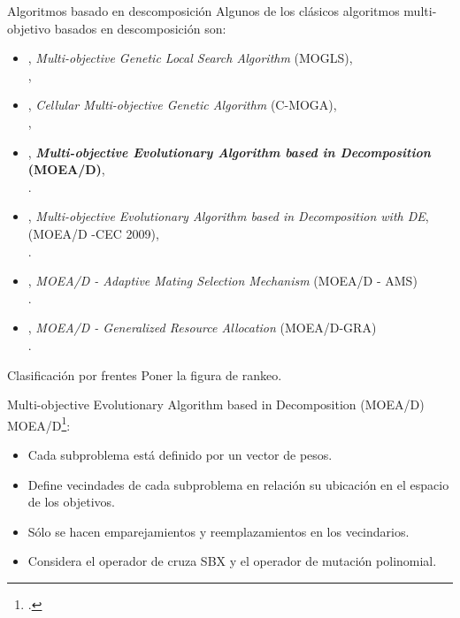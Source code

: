 \documentclass{beamer}
\begin{document}
 
\begin{frame}{Algoritmos basado en descomposición}
Algunos de los clásicos algoritmos multi-objetivo basados en descomposición son:
\begin{itemize}
     \scriptsize
    \item \citeyear{ishibuchi1998multi}, \textit{Multi-objective Genetic Local Search Algorithm} (MOGLS), \\ \citeauthor{ishibuchi1998multi},
    \item \citeyear{murata2002cellular}, \textit{Cellular Multi-objective Genetic Algorithm} (C-MOGA), \\ \citeauthor{murata2002cellular}, 
    \item \citeyear{Joel:MOEAD}, \textbf{\textit{Multi-objective Evolutionary Algorithm based in Decomposition} (MOEA/D)}, \\ \citeauthor{Joel:MOEAD}.
     \item \citeyear{li2009multiobjective}, \textit{Multi-objective Evolutionary Algorithm based in Decomposition with DE}, (MOEA/D -CEC 2009), \\ \citeauthor{li2009multiobjective}.
    \item \citeyear{Joel:MOEAD_AMS}, \textit{MOEA/D - Adaptive Mating Selection Mechanism} (MOEA/D - AMS) \\ \citeauthor{Joel:MOEAD_AMS}.
    \item \citeyear{zhou2015all}, \textit{MOEA/D - Generalized Resource Allocation} (MOEA/D-GRA) \\ \citeauthor{zhou2015all}.
\end{itemize}
\end{frame}
\begin{frame}{Clasificación por frentes}
    Poner la figura de rankeo.
\end{frame}

\begin{frame}{Multi-objective Evolutionary Algorithm based in Decomposition (MOEA/D)}
\scriptsize
MOEA/D\footcite{ishibuchi1998multi}:
\begin{itemize}
\scriptsize
    \item Cada subproblema está definido por un vector de pesos.
    \item Define vecindades de cada subproblema en relación su ubicación en el espacio de los objetivos.
    \item Sólo se hacen emparejamientos y reemplazamientos en los vecindarios.
    \item Considera el operador de cruza SBX y el operador de mutación polinomial.
\end{itemize}
\end{frame}
\end{document}
